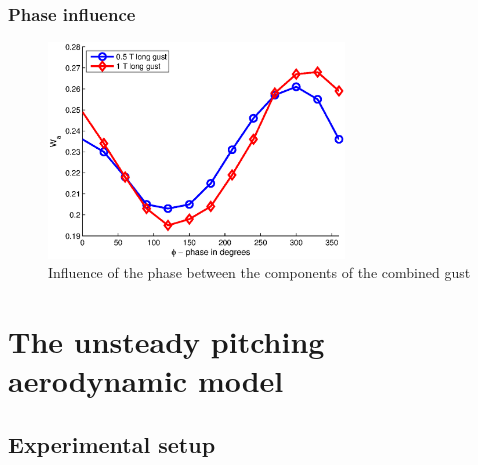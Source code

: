 \documentclass[compress]{beamer}
\begin{document}
\begin{frame}
  \frametitle{Phase influence}
  \begin{figure}[ht]
    \begin{center}
      \includegraphics[width=0.7\textwidth]{./Figures/combined_gust_amplitude_vs_phase_LUT.eps}
    \end{center}
    \caption{Influence of the phase between the components of the combined gust}
    \label{fig:combined_amplitude_phase}
  \end{figure}
\end{frame}


\section[GK model]{The unsteady pitching aerodynamic model}

\subsection{Experimental setup}
\end{document}
